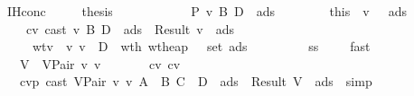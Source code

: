 \begin{isabellebody}
\ \ \ \ \isamarkupfalse \ IH{}conc\isanewline
\ \ \ \ \isamarkupfalse \ {\isacharquery}thesis\isanewline
\ \ \ \ \isamarkupfalse \isanewline
\ \ \ \ \ \ \isamarkupfalse \ {\isachardoublequoteopen}{\isacharquery}P\ v{}\ B\ D\ {\isasymmu}{}\ ads{}\ {\isasymSigma}{}{\isachardoublequoteclose}\isanewline
\ \ \ \ \ \ \isamarkupfalse \ this\ \isamarkupfalse \ v{}{\isacharprime}\ {\isasymSigma}{}\ {\isasymmu}{}\ ads{}\ \isanewline
\ \ \ \ \ \ \ \ cv{}{\isacharcolon}\ {\isachardoublequoteopen}cast\ v{}\ B\ D\ {\isasymmu}{}\ ads{}\ {\isacharequal}\ Result\ {\isacharparenleft}v{}{\isacharprime}{\isacharcomma}\ {\isasymmu}{}{\isacharcomma}\ ads{}{\isacharparenright}{\isachardoublequoteclose}\isanewline
\ \ \ \ \ \ \ \ \ wtv{}{\isacharcolon}\ {\isachardoublequoteopen}{\isasymSigma}{}\ {\isasymturnstile}v\ v{}{\isacharprime}\ {\isacharcolon}\ D{\isachardoublequoteclose}\ \ wth{}{\isacharcolon}\ {\isachardoublequoteopen}wt{\isacharunderscore}heap\ {\isasymSigma}{}\ {\isasymmu}{}\ {\isacharparenleft}set\ ads{}{\isacharparenright}{\isachardoublequoteclose}\isanewline
\ \ \ \ \ \ \ \ \ s{}s{}{\isacharcolon}\ {\isachardoublequoteopen}{\isasymSigma}{}\ {\isasymsqsubseteq}\ {\isasymSigma}{}{\isachardoublequoteclose}\ \isamarkupfalse \ fast\ \isamarkupfalse \isanewline
\ \ \ \ \ \ \isamarkupfalse \ {\isacharquery}V\ {\isacharequal}\ {\isachardoublequoteopen}VPair\ v{}{\isacharprime}\ v{}{\isacharprime}{\isachardoublequoteclose}\isanewline
\ \ \ \ \ \ \isamarkupfalse \ cv{}\ cv{}\isanewline
\ \ \ \ \ \ \isamarkupfalse \ cvp{\isacharcolon}\ {\isachardoublequoteopen}cast\ {\isacharparenleft}VPair\ v{}\ v{}{\isacharparenright}\ {\isacharparenleft}A\ {\isasymtimes}\ B{\isacharparenright}\ {\isacharparenleft}C\ {\isasymtimes}\ D{\isacharparenright}\ {\isasymmu}\ ads{}\ {\isacharequal}\ Result\ {\isacharparenleft}{\isacharquery}V{\isacharcomma}\ {\isasymmu}{}{\isacharcomma}\ ads{}{\isacharparenright}{\isachardoublequoteclose}\ \isamarkupfalse \ simp\isanewline

\end{isabellebody}
